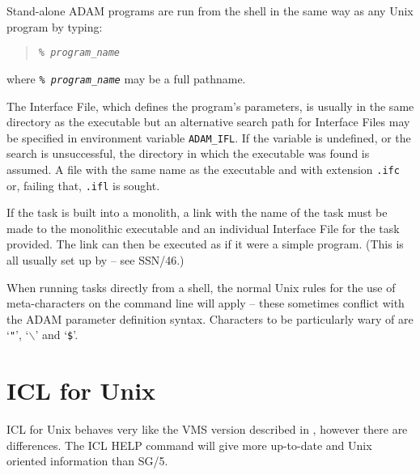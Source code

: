 \documentclass[twoside,11pt,nolof]{starlink}
\begin{document}
Stand-alone ADAM programs are run from the shell in the same way as any Unix
program by typing:
\begin{small}
\begin{quote}
\texttt{\% \textit{program\_name}}
\end{quote}
\end{small}
where \texttt{\% \textit{program\_name}} may be a full pathname.

The Interface File, which defines the program's parameters, is usually in the
same directory as the executable but an alternative search path for Interface
Files may be specified in environment variable \texttt{ADAM\_IFL}.
If the variable is undefined, or the search is unsuccessful, the directory in
which the executable was found is assumed.
A file with the same name as the executable and with extension
\texttt{.ifc} or, failing that, \texttt{.ifl} is sought.

If the task is built into a monolith, a link with the name of the task must be
made to the monolithic executable and an individual Interface File for the task
provided. The link can then be executed as if it were a simple program.
(This is all usually set up by
 -- see SSN/46.)

When running tasks directly from a shell, the normal Unix rules for the
use of meta-characters on the command line will apply -- these sometimes
conflict with the ADAM parameter definition syntax.
Characters to be particularly wary of are `{\texttt{"}}',
`{\texttt{$\backslash$}}' and `{\texttt{\$}}'.

\section{ICL for Unix}
ICL for Unix behaves very like the VMS version described in
,
however there are differences.
The ICL HELP command will give more up-to-date and Unix
oriented information than SG/5.
\end{document}
